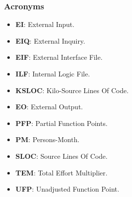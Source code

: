 \subsubsection{Acronyms}

\begin{itemize}
	\item \textbf{EI}: External Input.
	\item \textbf{EIQ}: External Inquiry. 
	\item \textbf{EIF}: External Interface File.
	\item \textbf{ILF}: Internal Logic File.
	\item \textbf{KSLOC}: Kilo-Source Lines Of Code.
	\item \textbf{EO}: External Output.
	\item \textbf{PFP}: Partial Function Points.
	\item \textbf{PM}: Persons-Month.
	\item \textbf{SLOC}: Source Lines Of Code.
	\item \textbf{TEM}: Total Effort Multiplier.
	\item \textbf{UFP}: Unadjusted Function Point.
\end{itemize}
